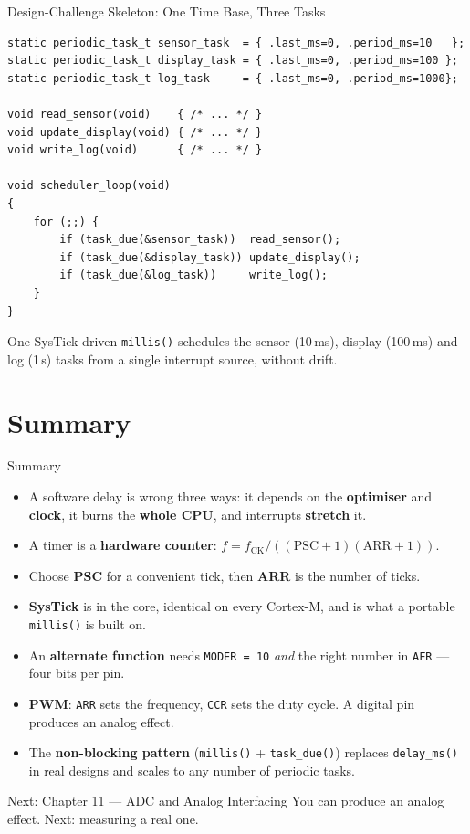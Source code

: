 \documentclass[aspectratio=169]{beamer}
\begin{document}
\begin{frame}[fragile]{Design-Challenge Skeleton: One Time Base, Three Tasks}
\begin{lstlisting}
static periodic_task_t sensor_task  = { .last_ms=0, .period_ms=10   };
static periodic_task_t display_task = { .last_ms=0, .period_ms=100 };
static periodic_task_t log_task     = { .last_ms=0, .period_ms=1000};

void read_sensor(void)    { /* ... */ }
void update_display(void) { /* ... */ }
void write_log(void)      { /* ... */ }

void scheduler_loop(void)
{
    for (;;) {
        if (task_due(&sensor_task))  read_sensor();
        if (task_due(&display_task)) update_display();
        if (task_due(&log_task))     write_log();
    }
}
\end{lstlisting}
{\small One SysTick-driven \texttt{millis()} schedules the sensor
(10\,ms), display (100\,ms) and log (1\,s) tasks from a single
interrupt source, without drift.}
\end{frame}

\section{Summary}

\begin{frame}{Summary}
\begin{itemize}
  \item A software delay is wrong three ways: it depends on the \textbf{optimiser} and \textbf{clock}, it burns the \textbf{whole CPU}, and interrupts \textbf{stretch} it.
  \item A timer is a \textbf{hardware counter}: $f = f_{\text{CK}}/((\text{PSC}{+}1)(\text{ARR}{+}1))$.
  \item Choose \textbf{PSC} for a convenient tick, then \textbf{ARR} is the number of ticks.
  \item \textbf{SysTick} is in the core, identical on every Cortex-M, and is what a portable \texttt{millis()} is built on.
  \item An \textbf{alternate function} needs \texttt{MODER = 10} \emph{and} the right number in \texttt{AFR} --- four bits per pin.
  \item \textbf{PWM}: \texttt{ARR} sets the frequency, \texttt{CCR} sets the duty cycle. A digital pin produces an analog effect.
  \item The \textbf{non-blocking pattern} (\texttt{millis()} + \texttt{task\_due()}) replaces \texttt{delay\_ms()} in real designs and scales to any number of periodic tasks.
\end{itemize}

\vspace{0.5em}
\begin{block}{Next: Chapter 11 --- ADC and Analog Interfacing}
You can produce an analog effect. Next: measuring a real one.
\end{block}
\end{frame}
\end{document}

